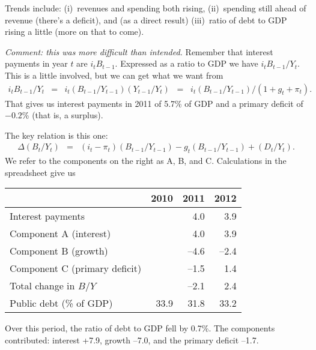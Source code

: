 \documentclass[letterpaper,12pt]{exam}
\begin{document}
\begin{questions}
\begin{solution}
\begin{parts}
\item Trends include:
(i)~revenues and spending both rising,
(ii)~spending still ahead of revenue (there's a deficit),
and (as a direct result)
(iii)~ratio of debt to GDP rising a little
(more on that to come).

\item {\it Comment:  this was more difficult than intended.}
Remember that interest payments in year $t$ are $ i_t B_{t-1}$.
Expressed as a ratio to GDP we have $ i_t B_{t-1}/Y_t$.
This is a little involved, but we can get what we want from
\begin{eqnarray*}
    i_t B_{t-1}/ Y_{t} &=& i_t (B_{t-1}/ Y_{t-1}) (Y_{t-1}/ Y_{t})
            \;\;=\;\; i_t (B_{t-1}/Y_{t-1}) /(1+g_t + \pi_t) .
\end{eqnarray*}
That gives us interest payments in 2011 of 5.7\% of GDP and
a primary deficit of $-0.2$\% (that is, a surplus).

\item The key relation is this one:
\begin{eqnarray*}
    \Delta ({B_{t}}/{Y_{t}})
            &=&
                (i_t-\pi_t) ({B_{t-1}}/{Y_{t-1}})
                - g_t ({B_{t-1}}/{Y_{t-1}})
             +    ({D_{t}}/{Y_{t}})  .
\end{eqnarray*}
We refer to the components on the right as A, B, and C.
Calculations in the spreadsheet give us

\medskip
\begin{center}
\begin{tabular}{lrrr}
\toprule
        &  2010 & 2011 & 2012  \\
\midrule
Interest payments  &  &  4.0 & 3.9 \\
Component A (interest)  &  &  4.0 & 3.9 \\
Component B (growth)            &   & --4.6 &--2.4 \\
Component C (primary deficit)   &   & --1.5 & 1.4 \\
Total change in $B/Y$       &       &--2.1 & 2.4 \\
Public debt (\% of GDP)     &  33.9 & 31.8 & 33.2 \\
\bottomrule
\end{tabular}
\end{center}
\medskip

Over this period, the ratio of debt to GDP fell by 0.7\%.
The components contributed:
interest +7.9, growth --7.0, and the primary deficit --1.7.


\end{parts}
\end{solution}
\end{questions}
\end{document}
